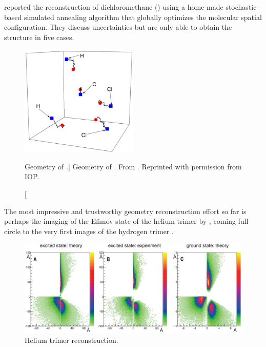 \citet{Gagnon08} reported the reconstruction of dichloromethane () using a home-made \footnotemark stochastic-based simulated annealing algorithm that globally optimizes the molecular spatial configuration. They discuss uncertainties but are only able to obtain the structure in five cases.


\begin{figure}
  \centering
  \includegraphics[width=0.5\textwidth]{gfx/CH2Cl2Geometry}
  \caption
  [Geometry of .]
  {Geometry of . From \citet{Gagnon08}. Reprinted with permission from IOP.}
  \label{fig:CH2Cl2geometry}
\end{figure}

The most impressive and trustworthy geometry reconstruction effort so far is perhaps the imaging of the Efimov state of the helium trimer by \citet{Kunitski15}, coming full circle to the very first images of the hydrogen trimer \citep{Gaillard78}.

\begin{figure}
  \centering
  \includegraphics[width=\textwidth]{gfx/HeliumTrimerReconstruction}
  \caption[Helium trimer reconstruction.]
  {Helium trimer reconstruction.}
  \label{fig:heliumTrimerReconstruction}
\end{figure}

